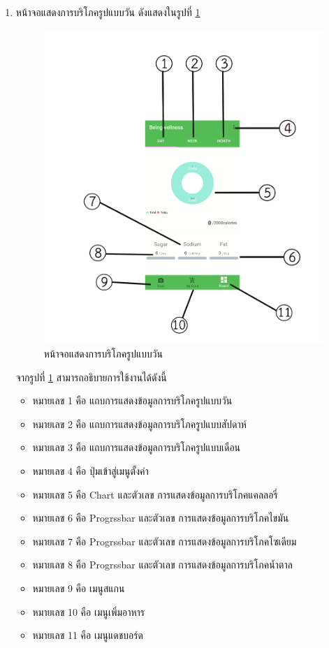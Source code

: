 \begin{enumerate}
			\item  หน้าจอแสดงการบริโภครูปแบบวัน ดังแสดงในรูปที่ \ref{Fig:Dashbord}
			\begin{figure}[H]
				\centering
				\includegraphics[width=0.5\columnwidth]{Figures/7/teach/3.png}
				\caption{หน้าจอแสดงการบริโภครูปแบบวัน}
				\label{Fig:Dashbord}
			\end{figure}
		จากรูปที่ \ref{Fig:Dashbord} สามารถอธิบายการใช้งานได้ดังนี้
			\begin{itemize}[label={--}]
				\item หมายเลข 1 คือ แถบการแสดงข้อมูลการบริโภครูปแบบวัน
				\item หมายเลข 2 คือ แถบการแสดงข้อมูลการบริโภครูปแบบสัปดาห์
				\item หมายเลข 3 คือ แถบการแสดงข้อมูลการบริโภครูปแบบเดือน
				\item หมายเลข 4 คือ ปุ่มเข้าสู่เมนูตั้งค่า
				\item หมายเลข 5 คือ Chart และตัวเลข การแสดงข้อมูลการบริโภคแคลลอรี่
				\item หมายเลข 6 คือ Progrssbar และตัวเลข การแสดงข้อมูลการบริโภคไขมัน
				\item หมายเลข 7 คือ Progrssbar และตัวเลข การแสดงข้อมูลการบริโภคโซเดียม
				\item หมายเลข 8 คือ Progrssbar และตัวเลข การแสดงข้อมูลการบริโภคน้ำตาล
				\item หมายเลข 9 คือ เมนูสแกน
				\item หมายเลข 10 คือ เมนูเพิ่มอาหาร
				\item หมายเลข 11 คือ เมนูแดชบอร์ด
			\end{itemize}



\end{enumerate}
